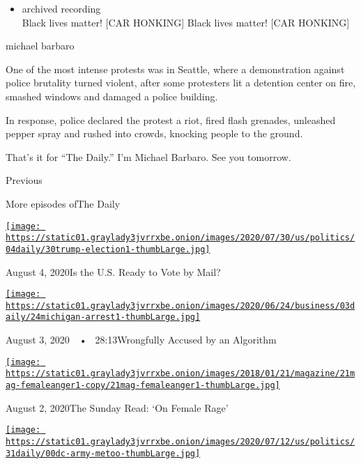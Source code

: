 \begin{itemize}
\tightlist
\item
  archived recording\\
  Black lives matter! {[}CAR HONKING{]} Black lives matter! {[}CAR
  HONKING{]}
\end{itemize}

michael barbaro

One of the most intense protests was in Seattle, where a demonstration
against police brutality turned violent, after some protesters lit a
detention center on fire, smashed windows and damaged a police building.

In response, police declared the protest a riot, fired flash grenades,
unleashed pepper spray and rushed into crowds, knocking people to the
ground.

That's it for ``The Daily.'' I'm Michael Barbaro. See you tomorrow.

Previous

More episodes ofThe Daily

\href{https://www.nytimes3xbfgragh.onion/2020/08/04/podcasts/the-daily/mail-in-voting-president-trump.html?action=click\&module=audio-series-bar\&region=header\&pgtype=Article}{\texttt{[image: https://static01.graylady3jvrrxbe.onion/images/2020/07/30/us/politics/04daily/30trump-election1-thumbLarge.jpg]}}

August 4, 2020Is the U.S. Ready to Vote by Mail?

\href{https://www.nytimes3xbfgragh.onion/2020/08/03/podcasts/the-daily/algorithmic-justice-racism.html?action=click\&module=audio-series-bar\&region=header\&pgtype=Article}{\texttt{[image: https://static01.graylady3jvrrxbe.onion/images/2020/06/24/business/03daily/24michigan-arrest1-thumbLarge.jpg]}}

August 3, 2020~~•~ 28:13Wrongfully Accused by an Algorithm

\href{https://www.nytimes3xbfgragh.onion/2020/08/02/podcasts/the-daily/on-female-rage.html?action=click\&module=audio-series-bar\&region=header\&pgtype=Article}{\texttt{[image: https://static01.graylady3jvrrxbe.onion/images/2018/01/21/magazine/21mag-femaleanger1-copy/21mag-femaleanger1-thumbLarge.jpg]}}

August 2, 2020The Sunday Read: `On Female Rage'

\href{https://www.nytimes3xbfgragh.onion/2020/07/31/podcasts/the-daily/vanessa-guillen-military-metoo.html?action=click\&module=audio-series-bar\&region=header\&pgtype=Article}{\texttt{[image: https://static01.graylady3jvrrxbe.onion/images/2020/07/12/us/politics/31daily/00dc-army-metoo-thumbLarge.jpg]}}

